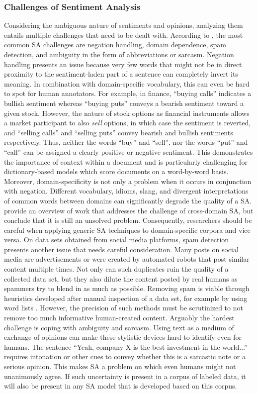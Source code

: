 \subsubsection{Challenges of Sentiment Analysis}
\label{section-sa-challenges}
Considering the ambiguous nature of sentiments and opinions, analyzing them entails multiple challenges that need to be dealt with. According to , the most common SA challenges are negation handling, domain dependence, spam detection, and ambiguity in the form of abbreviations or sarcasm. Negation handling presents an issue because very few words that might not be in direct proximity to the sentiment-laden part of a sentence can completely invert its meaning. In combination with domain-specific vocabulary, this can even be hard to spot for human annotators. For example, in finance, ``buying calls'' indicates a bullish sentiment whereas ``buying puts'' conveys a bearish sentiment toward a given stock. However, the nature of stock options as financial instruments allows a market participant to also \emph{sell} options, in which case the sentiment is reverted, and ``selling calls'' and ``selling puts'' convey bearish and bullish sentiments respectively. Thus, neither the words ``buy'' and ``sell'', nor the words ``put'' and ``call'' can be assigned a clearly positive or negative sentiment. This demonstrates the importance of context within a document and is particularly challenging for dictionary-based models which score documents on a word-by-word basis. Moreover, domain-specificity is not only a problem when it occurs in conjunction with negation. Different vocabulary, idioms, slang, and divergent interpretations of common words between domains can significantly degrade the quality of a SA.  provide an overview of work that addresses the challenge of cross-domain SA, but conclude that it is still an unsolved problem. Consequently, researchers should be careful when applying generic SA techniques to domain-specific corpora and vice versa. On data sets obtained from social media platforms, spam detection presents another issue that needs careful consideration. Many posts on social media are advertisements or were created by automated robots that post similar content multiple times. Not only can such duplicates ruin the quality of a collected data set, but they also dilute the content posted by real humans as spammers try to blend in as much as possible. Removing spam is viable through heuristics developed after manual inspection of a data set, for example by using word lists . However, the precision of such methods must be scrutinized to not remove too much informative human-created content. Arguably the hardest challenge is coping with ambiguity and sarcasm. Using text as a medium of exchange of opinions can make these stylistic devices hard to identify even for humans. The sentence ``Yeah, company X is the best investment in the world...'' requires intonation or other cues to convey whether this is a sarcastic note or a serious opinion. This makes SA a problem on which even humans might not unanimously agree. If such uncertainty is present in a corpus of labeled data, it will also be present in any SA model that is developed based on this corpus.
